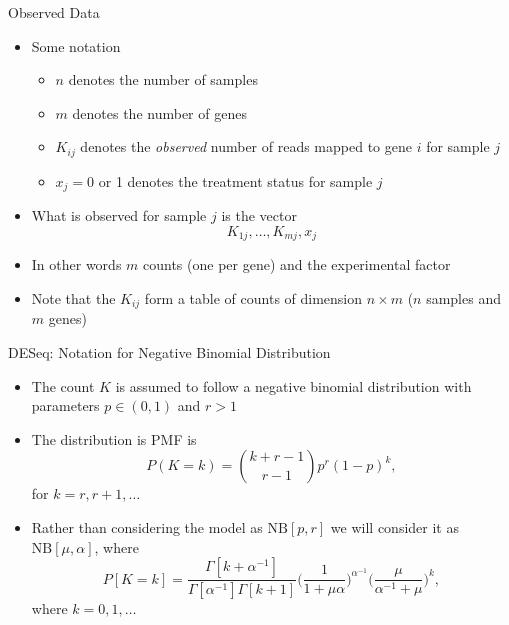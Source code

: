 \documentclass[xcolor=x11names,compress]{beamer}\usepackage[]{graphicx}\usepackage[]{color}
\begin{document}
\begin{frame}{Observed Data}
  \begin{itemize}
  \item Some notation
  \begin{itemize}
    
  \item $n$ denotes the number of samples
  \item $m$ denotes the number of genes
  \item $K_{ij}$ denotes the {\it observed} number of reads mapped to gene $i$ for sample $j$
  \item $x_j=0$ or 1 denotes the treatment status for sample $j$
  \end{itemize}
  \item What is observed for sample $j$ is the vector
    \begin{equation*}
      K_{1j},\ldots,K_{mj},x_j
    \end{equation*}
  \item In other words $m$ counts (one per gene) and the experimental factor
  \item Note that the $K_{ij}$ form a table of counts of dimension $n\times m$ ($n$ samples and
    $m$ genes)
  \end{itemize}
\end{frame}

\begin{frame}{DESeq: Notation for Negative Binomial Distribution}
  \begin{itemize}
  \item The count $K$ is assumed to follow a negative binomial distribution with parameters $p\in (0,1)$ and $r>1$
  \item The distribution is PMF is 
    \begin{equation*}
      P(K=k)={k+r-1 \choose r-1} p^r (1-p)^k,
    \end{equation*}
  for $k=r,r+1,\ldots$
  \item Rather than considering the model as $\mathrm{NB}[p,r]$ we will consider it as
    $\mathrm{NB}[\mu,\alpha]$, where
      \begin{equation*}
           P[K=k]=\frac{\Gamma[k+\alpha^{-1}]}{\Gamma[\alpha^{-1}]\Gamma[k+1]}
             \bigg(\frac{1}{1+\mu\alpha}\bigg)^{\alpha^{-1}}
             \bigg(\frac{\mu}{\alpha^{-1}+\mu}\bigg)^k,
        \end{equation*}
     where $k=0,1,\ldots$

  \end{itemize}
\end{frame}
\end{document}
